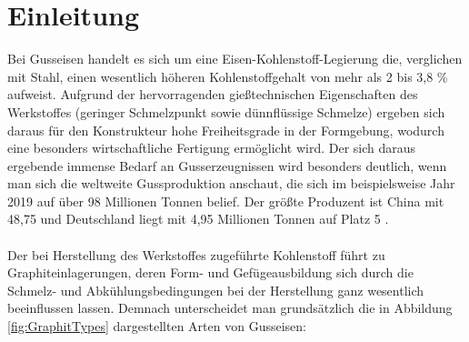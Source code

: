 \documentclass[
fontsize=10pt, 
listof = totoc,
parskip = half	
]{report}
\begin{document}
\chapter{Einleitung}
\label{ch:Einleitung}

Bei Gusseisen handelt es sich um eine Eisen-Kohlenstoff-Legierung die, verglichen mit Stahl, einen wesentlich höheren Kohlenstoffgehalt von mehr als 2 bis 3,8 \% aufweist. Aufgrund der hervorragenden gießtechnischen Eigenschaften des Werkstoffes (geringer Schmelzpunkt sowie dünnflüssige Schmelze) ergeben sich daraus für den Konstrukteur hohe Freiheitsgrade in der Formgebung, wodurch eine besonders wirtschaftliche Fertigung ermöglicht wird. Der sich daraus ergebende immense Bedarf an Gusserzeugnissen wird besonders deutlich, wenn man sich die weltweite Gussproduktion anschaut, die sich im beispielsweise Jahr 2019 auf über 98 Millionen Tonnen belief. Der größte Produzent ist China mit 48,75 und Deutschland liegt mit 4,95 Millionen Tonnen auf Platz 5 \cite{Statista2021}.
\\\\
Der bei Herstellung des Werkstoffes zugeführte Kohlenstoff führt zu Graphiteinlagerungen, deren Form- und Gefügeausbildung sich durch die Schmelz- und Abkühlungsbedingungen bei der Herstellung ganz wesentlich beeinflussen lassen. Demnach unterscheidet man grundsätzlich die in Abbildung \ref{fig:GraphitTypes} dargestellten Arten von Gusseisen:
\end{document}
